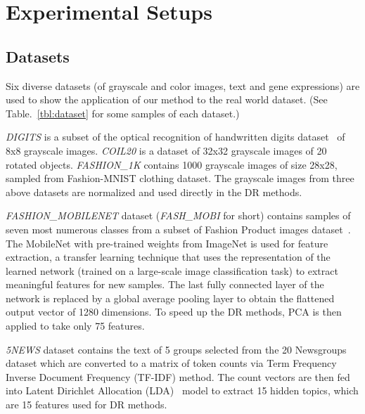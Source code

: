 \section{Experimental Setups}


\subsection{Datasets}

Six diverse datasets (of grayscale and color images, text and gene expressions) are used to show the application of our method to the real world dataset. (See Table.~\ref{tbl:dataset} for some samples of each dataset.)

\emph{DIGITS} is a subset of the optical recognition of handwritten digits dataset~\cite{kaynak1995methods} of 8x8 grayscale images.
\emph{COIL20} \cite{nene1996} is a dataset of 32x32 grayscale images of 20 rotated objects.
\emph{FASHION\_1K} contains 1000 grayscale images of size 28x28, sampled from Fashion-MNIST\cite{xiao2017/online} clothing dataset.
The grayscale images from three above datasets are normalized and used directly in the DR methods.

\emph{FASHION\_MOBILENET} dataset (\emph{FASH\_MOBI} for short) contains samples of seven most numerous classes from a subset of Fashion Product images dataset~\cite{fashionproduct}.
The MobileNet\cite{howard2017mobilenets} with pre-trained weights from ImageNet is used for feature extraction, a transfer learning technique that uses the representation of the learned network (trained on a large-scale image classification task) to extract meaningful features for new samples.
The last fully connected layer of the network is replaced by a global average pooling layer\cite[Sec.3.2]{lin2013network} to obtain the flattened output vector of 1280 dimensions.
To speed up the DR methods, PCA is then applied to take only 75 features.

\emph{5NEWS} dataset contains the text of 5 groups selected from the 20 Newsgroups dataset which are converted to a matrix of token counts via Term Frequency Inverse Document Frequency (TF-IDF) method.
The count vectors are then fed into Latent Dirichlet Allocation (LDA)~\cite{blei2003latent} model to extract 15 hidden topics, which are 15 features used for DR methods.

